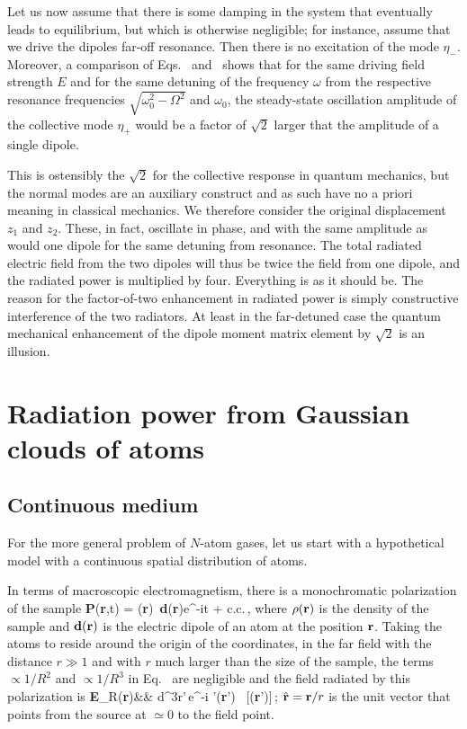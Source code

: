 Let us now assume that there is some damping in the system that eventually leads to equilibrium, but which is otherwise negligible; for instance, assume that we drive the dipoles far-off resonance. Then there is no excitation of the mode $\eta_-$. Moreover, a comparison of Eqs.~ and~  shows that for the same driving field strength $E$ and for the same detuning of the frequency $\omega$ from the respective resonance frequencies $\sqrt{\omega_0^2-\Omega^2}$ and  $\omega_0$, the steady-state oscillation amplitude of the collective mode $\eta_+$ would be a factor of $\sqrt 2$ larger that the amplitude of a single dipole.

This is ostensibly the $\sqrt 2$ for the collective response in quantum mechanics, but the normal modes are an auxiliary construct and as such have no a priori meaning in classical mechanics. We therefore consider the original displacement $z_1$ and $z_2$. These, in fact, oscillate in phase, and with the same amplitude as would one dipole for the same detuning from resonance. The total radiated electric field from the two dipoles will thus be twice the field from one dipole, and the radiated power is multiplied by four. Everything is as it should be. The reason for the factor-of-two enhancement in radiated power is simply constructive interference of the two radiators. At least in the far-detuned case the quantum mechanical enhancement of the dipole moment matrix element by $\sqrt2$ is an illusion.


\section{Radiation power from Gaussian clouds of atoms}


\subsection{Continuous medium}

For the more general problem of $N$-atom gases, let us start with a hypothetical model with a continuous spatial distribution of atoms.

In terms of macroscopic electromagnetism, there is a monochromatic polarization of the sample
\beq
{\bf P}({\bf r},t) = \half\rho({\bf r}) \,{\bf d}({\bf r})e^{-i\omega t} + {\rm c.c.}\,,
\eeq 
where $\rho({\bf r})$ is the density of the sample  and $\bf d({\bf r})$ is the electric dipole of an atom at the position $\bf r$. Taking the atoms  to reside around the origin of the coordinates, in the far field with the distance $r\gg1$ and with $r$ much larger than the size of the sample, the terms  $\propto 1/R^2$ and $\propto 1/R^3$ in Eq.~ are negligible and the  field  radiated by this polarization is
\bea
{\bf E}_R({\bf r})&\simeq& \int d^3r'\,e^{-i  '}\rho({\bf r}')
\, [({\bf r}')]\times{}\,;
\label{SCATFIELD}
\eea
$\hat{\bf r}={\bf r}/r$ is the unit vector that points from the source at $\simeq 0$ to the field point. 


